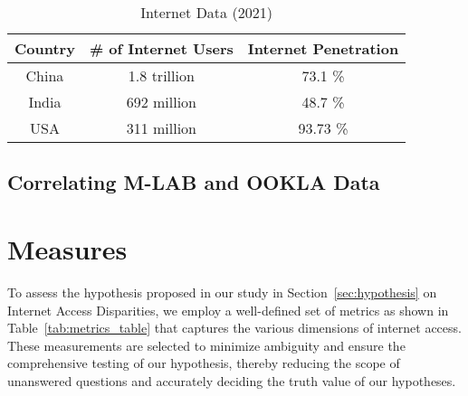 \documentclass[conference]{IEEEtran}
\begin{document}
\begin{table}[htbp]
\caption{Internet Data (2021)}
\label{tab:overviewtable}
\begin{center}
\begin{tabular}{|c|c|c}
\hline
Country & \# of Internet Users & Internet Penetration \\
\hline
China & 1.8 trillion & 73.1 \% \\
\hline
India & 692 million & 48.7 \% \\
\hline
USA & 311 million & 93.73 \% \\
\hline
\end{tabular}
\label{tab:overview}
\end{center}
\end{table}

\subsection{Correlating M-LAB and OOKLA Data}




\section{Measures}
To assess the hypothesis proposed in our study in Section~\ref{sec:hypothesis} on Internet Access Disparities, we employ a well-defined set of metrics as shown in Table~\ref{tab:metrics_table} that captures the various dimensions of internet access. These measurements are selected to minimize ambiguity and ensure the comprehensive testing of our hypothesis, thereby reducing the scope of unanswered questions and accurately deciding the truth value of our hypotheses.
\end{document}
